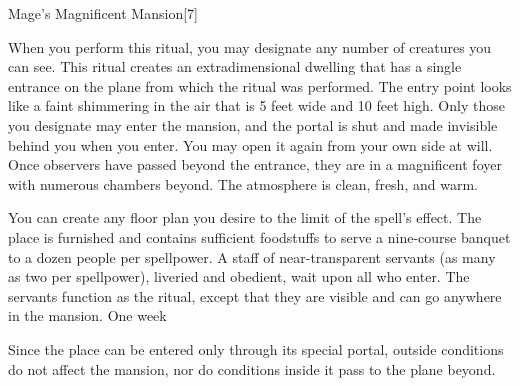 \begin{spellsection}{Mage's Magnificent Mansion}[7]
    \begin{spellheader}
    \end{spellheader}
    \begin{spellcontent}
        \begin{spelltargetinginfo}
        \end{spelltargetinginfo}
        \begin{spelleffects}

            \spellspecial When you perform this ritual, you may designate any number of creatures you can see.
            \spellline
            \spelleffect This ritual creates an extradimensional dwelling that has a single entrance on the plane from which the ritual was performed. The entry point looks like a faint shimmering in the air that is 5 feet wide and 10 feet high. Only those you designate may enter the mansion, and the portal is shut and made invisible behind you when you enter. You may open it again from your own side at will. Once observers have passed beyond the entrance, they are in a magnificent foyer with numerous chambers beyond. The atmosphere is clean, fresh, and warm.
            \par You can create any floor plan you desire to the limit of the spell's effect. The place is furnished and contains sufficient foodstuffs to serve a nine-course banquet to a dozen people per spellpower. A staff of near-transparent servants (as many as two per spellpower), liveried and obedient, wait upon all who enter. The servants function as the  ritual, except that they are visible and can go anywhere in the mansion.
            \spelldur One week \dismissable
        \end{spelleffects}
    \end{spellcontent}
    \begin{spellfooter}
        \spellnotes Since the place can be entered only through its special portal, outside conditions do not affect the mansion, nor do conditions inside it pass to the plane beyond.
    \end{spellfooter}
\end{spellsection}


